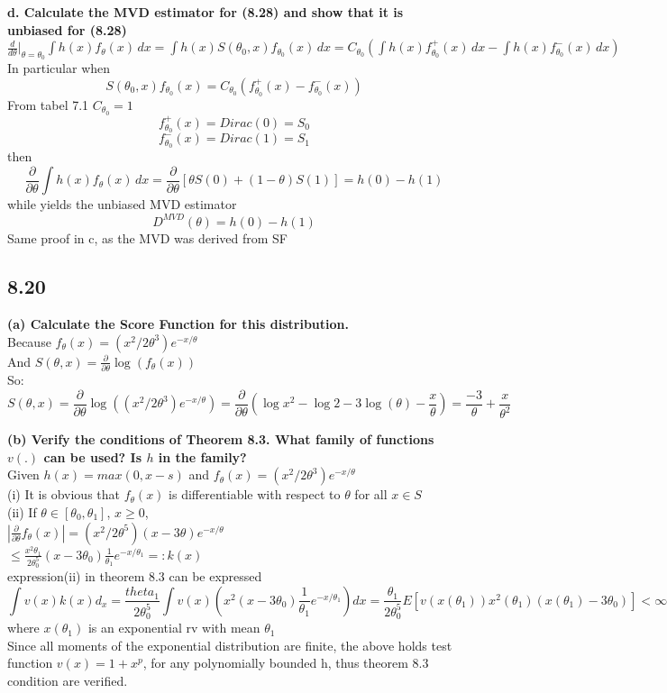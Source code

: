 \documentclass{article}
\begin{document}
\textbf{d. Calculate the MVD estimator for (8.28) and show that it is unbiased for (8.28)} \\
$ \frac{d}{d\theta}|_{\theta=\theta_0}{\textstyle \int h(x)f_\theta(x)\,dx} = {\textstyle \int h(x)S(\theta_0,x)f_{\theta_0}(x)\,dx}=C_{\theta_0}({\textstyle \int h(x)f_{\theta_0}^+(x)\,dx}-{\textstyle \int h(x)f_{\theta_0}^-(x)\,dx}) $  \\
In particular when $$ S(\theta_0,x)f_{\theta_0}(x)=C_{\theta_0}(f_{\theta_0}^+(x)-f_{\theta_0}^-(x)) $$
From tabel 7.1 $C_{\theta_0} = 1$  \\
$$ f_{\theta_0}^+(x) = Dirac(0) = S_0 $$
$$ f_{\theta_0}^-(x) = Dirac(1) = S_1 $$
then $$ \frac{\partial}{\partial\theta}{\textstyle \int h(x)f_\theta(x)\,dx} = \frac{\partial}{\partial\theta}[\theta S(0)+(1-\theta)S(1)] = h(0)-h(1)  $$
while yields the unbiased MVD estimator $$ D^{MVD}(\theta) = h(0)-h(1) $$
Same proof in c, as the MVD was derived from SF

\subsection{8.20}

\textbf{(a) Calculate the Score Function for this distribution.} \\
Because $f_\theta(x)=(x^2/2\theta^3)e^{-x/\theta}$  \\
And $S(\theta, x)=\frac{\partial}{\partial \theta}\log(f_\theta(x))$ \\
So: $$ S(\theta, x) = \frac{\partial}{\partial \theta}\log((x^2/2\theta^3)e^{-x/\theta}) =\frac{\partial}{\partial \theta}(\log x^2-\log 2-3\log(\theta)-\frac{x}{\theta})=\frac{-3}{\theta} + \frac{x}{\theta^2}  $$


\textbf{(b) Verify the conditions of Theorem 8.3. What family of functions $v(.)$ can be used? Is $h$ in the family?} \\
Given $h(x) = max(0, x-s)$ and $f_\theta(x)=(x^2/2\theta^3)e^{-x/\theta}$ \\
(i) It is obvious that $f_\theta(x)$ is differentiable with respect to $\theta$ for all $x\in S$  \\
(ii) If $\theta\in[\theta_0, \theta_1]$, $x\geq 0$,  \\
$|\frac{\partial}{\partial \theta}f_\theta(x)|=(x^2/2\theta^5)(x-3\theta)e^{-x/\theta} $  \\
$\leq \frac{x^2\theta_1}{2\theta_0^5}(x-3\theta_0)\frac{1}{\theta_1}e^{-x/\theta_1}=:k(x)  $  \\
expression(ii) in theorem 8.3 can be expressed $$\int v(x)k(x)d_x=\frac{theta_1}{2\theta_0^5}\int v(x)(x^2(x-3\theta_0)\frac{1}{\theta_1}e^{-x/\theta_1}) dx=\frac{\theta_1}{2\theta_0^5}E[v(x(\theta_1))x^2(\theta_1)(x(\theta_1)-3\theta_0)]<\infty   $$
where $x(\theta_1)$ is an exponential rv with mean $\theta_1$  \\
Since all moments of the exponential distribution are finite, the above holds test function $v(x)=1+x^p$, for any polynomially bounded h, thus theorem 8.3 condition are verified.
\end{document}
